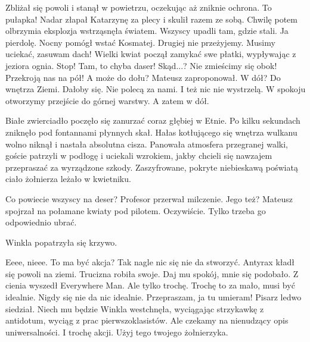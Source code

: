 \begin{dialogue}
Zbliżał się powoli i stanął w powietrzu, oczekując aż zniknie ochrona.
\ds{} To pułapka! \dm{} Nadar złapał Katarzynę za plecy i skulił razem ze sobą. Chwilę potem olbrzymia eksplozja wstrząsnęła światem. Wszyscy upadli tam, gdzie stali.
\ds{} Ja pierdolę. \dm{} Nocny pomógł wstać Kosmatej. \dm{} Drugiej nie przeżyjemy.
\ds{} Musimy uciekać, zasuwam dach! \dm{} Wielki kwiat począł zamykać swe płatki, wypływając z jeziora ognia.
\ds{} Stop! Tam, to chyba daser!
\ds{} Skąd...?
\ds{} Nie zmieścimy się obok! Przekroją nas na pół!
\ds{} A może do dołu? \dm{} Mateusz zaproponował.
\ds{} W dół?
\ds{} Do wnętrza Ziemi.
\ds{} Dałoby się.
\ds{} Nie polecą za nami.
\ds{} I też nic nie wystrzelą.
\ds{} W spokoju otworzymy przejście do górnej warstwy.
\ds{} A zatem w dół.
\end{dialogue}

Białe zwierciadło poczęło się zanurzać coraz głębiej w Etnie.
Po kilku sekundach zniknęło pod fontannami płynnych skał.
Hałas kotłującego się wnętrza wulkanu wolno niknął i nastała absolutna cisza.
Panowała atmosfera przegranej walki, goście patrzyli w podłogę i uciekali wzrokiem, jakby chcieli się nawzajem przepraszać za wyrządzone szkody.
Zaszyfrowane, pokryte niebieskawą poświatą ciało żołnierza leżało w kwietniku.

\begin{dialogue}
\ds{} Co powiecie wszyscy na deser? \dm{} Profesor przerwał milczenie.
\ds{} Jego też? \dm{} Mateusz spojrzał na połamane kwiaty pod pilotem.
\ds{} Oczywiście. Tylko trzeba go odpowiednio ubrać.
\end{dialogue}

\divider{}

Winkla popatrzyła się krzywo.
\begin{dialogue}
\ds{} Eeee, nieee. To ma być akcja? 
\ds{} Tak nagle nic się nie da stworzyć. \dm{} Antyrax kładł się powoli na ziemi. Trucizna robiła swoje.
\ds{} Daj mu spokój, mnie się podobało. \dm{} Z cienia wyszedł Everywhere Man. \dm{} Ale tylko trochę.
\ds{} Trochę to za mało, musi być idealnie.
\ds{} Nigdy się nie da nic idealnie.
\ds{} Przepraszam, ja tu umieram! \dm{} Pisarz ledwo siedział.
\ds{} Niech mu będzie \dm{} Winkla westchnęła, wyciągając strzykawkę z antidotum, wyciąg z prac pierwszoklasistów. \dm{} Ale czekamy na nienudzący opis uniwersalności.
\ds{} I trochę akcji. Użyj tego twojego żołnierzyka.
\end{dialogue}

\divider{}

